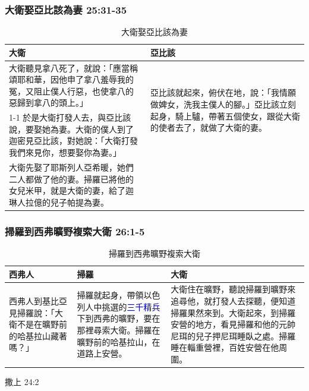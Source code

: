 \subsubsection{大衛娶亞比該為妻 25:31-35}
\begin{table}[H]
\hspace*{-5mm}
\centering
\begin{tabular}{p{10.5cm}|p{6.5cm}}\hline\hline
大衛&亞比該\\\hline
大衛聽見拿八死了，就說：「應當稱頌耶和華，因他申了拿八羞辱我的冤，又阻止僕人行惡，也使拿八的惡歸到拿八的頭上。」&\multirow{2}{6.65cm}{亞比該就起來，俯伏在地，說：「我情願做婢女，洗我主僕人的腳。」亞比該立刻起身，騎上驢，帶著五個使女，跟從大衛的使者去了，就做了大衛的妻。}\\\cline{1-1}
於是大衛打發人去，與亞比該說，要娶她為妻。大衛的僕人到了迦密見亞比該，對她說：「大衛打發我們來見你，想要娶你為妻。」& \\\hline
大衛先娶了耶斯列人亞希暖，她們二人都做了他的妻。掃羅已將他的女兒米甲，就是大衛的妻，給了迦琳人拉億的兒子帕提為妻。& \\\hline
\end{tabular}
\caption{大衛娶亞比該為妻}
\end{table}

\subsubsection{掃羅到西弗曠野複索大衛 26:1-5}
\begin{table}[H]
\hspace*{-5mm}
\begin{minipage}{10cm}
\begin{threeparttable}[t]
\centering
\begin{tabular}{p{}|p{5.5cm}|p{8.5cm}}\hline\hline
西弗人&掃羅&大衛\\\hline
西弗人到基比亞見掃羅說：「大衛不是在曠野前的哈基拉山藏著嗎？」&掃羅就起身，帶領以色列人中挑選的\textcolor{blue}{三千精兵\tnote{1}} 下到西弗的曠野，要在那裡尋索大衛。掃羅在曠野前的哈基拉山，在道路上安營。&大衛住在曠野，聽說掃羅到曠野來追尋他，就打發人去探聽，便知道掃羅果然來到。大衛起來，到掃羅安營的地方，看見掃羅和他的元帥尼珥的兒子押尼珥睡臥之處。掃羅睡在輜重營裡，百姓安營在他周圍。\\\hline
\end{tabular}
\begin{tablenotes}
     \item[1] 撒上 24:2
   \end{tablenotes}
\end{threeparttable}
\end{minipage}
\caption{掃羅到西弗曠野複索大衛}
\end{table}

